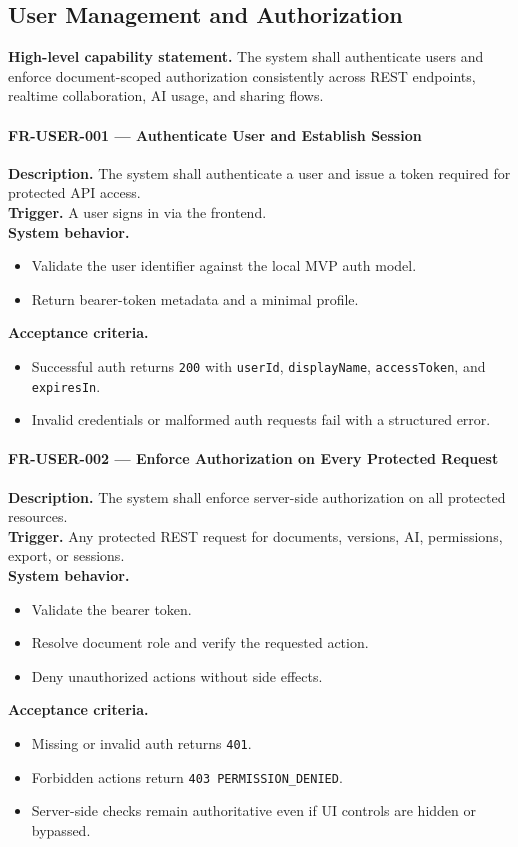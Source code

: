\subsection{User Management and Authorization}

\textbf{High-level capability statement.} The system shall authenticate users and enforce document-scoped
authorization consistently across REST endpoints, realtime collaboration, AI usage, and sharing flows.

\paragraph{FR-USER-001 --- Authenticate User and Establish Session}
\textbf{Description.} The system shall authenticate a user and issue a token required for protected API access.\\
\textbf{Trigger.} A user signs in via the frontend.\\
\textbf{System behavior.}
\begin{itemize}
  \item Validate the user identifier against the local MVP auth model.
  \item Return bearer-token metadata and a minimal profile.
\end{itemize}
\textbf{Acceptance criteria.}
\begin{itemize}
  \item Successful auth returns \texttt{200} with \texttt{userId}, \texttt{displayName}, \texttt{accessToken}, and \texttt{expiresIn}.
  \item Invalid credentials or malformed auth requests fail with a structured error.
\end{itemize}

\paragraph{FR-USER-002 --- Enforce Authorization on Every Protected Request}
\textbf{Description.} The system shall enforce server-side authorization on all protected resources.\\
\textbf{Trigger.} Any protected REST request for documents, versions, AI, permissions, export, or sessions.\\
\textbf{System behavior.}
\begin{itemize}
  \item Validate the bearer token.
  \item Resolve document role and verify the requested action.
  \item Deny unauthorized actions without side effects.
\end{itemize}
\textbf{Acceptance criteria.}
\begin{itemize}
  \item Missing or invalid auth returns \texttt{401}.
  \item Forbidden actions return \texttt{403 PERMISSION\_DENIED}.
  \item Server-side checks remain authoritative even if UI controls are hidden or bypassed.
\end{itemize}

